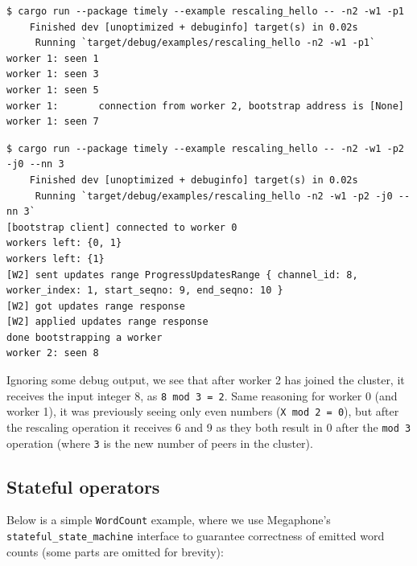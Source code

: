 \documentclass[12pt]{extarticle}
\begin{document}
\begin{verbatim}
$ cargo run --package timely --example rescaling_hello -- -n2 -w1 -p1
    Finished dev [unoptimized + debuginfo] target(s) in 0.02s
     Running `target/debug/examples/rescaling_hello -n2 -w1 -p1`
worker 1: seen 1
worker 1: seen 3
worker 1: seen 5
worker 1:       connection from worker 2, bootstrap address is [None]
worker 1: seen 7
\end{verbatim}

\begin{verbatim}
$ cargo run --package timely --example rescaling_hello -- -n2 -w1 -p2 -j0 --nn 3
    Finished dev [unoptimized + debuginfo] target(s) in 0.02s
     Running `target/debug/examples/rescaling_hello -n2 -w1 -p2 -j0 --nn 3`
[bootstrap client] connected to worker 0
workers left: {0, 1}
workers left: {1}
[W2] sent updates range ProgressUpdatesRange { channel_id: 8, worker_index: 1, start_seqno: 9, end_seqno: 10 }
[W2] got updates range response
[W2] applied updates range response
done bootstrapping a worker
worker 2: seen 8
\end{verbatim}

Ignoring some debug output, we see that after worker 2 has joined the cluster, it receives the input integer 8,
as \verb|8 mod 3 = 2|. Same reasoning for worker 0 (and worker 1), it was previously seeing only even numbers
(\verb|X mod 2 = 0|), but after the rescaling operation it receives 6 and 9 as they both result in 0 after the \verb|mod 3|
operation (where \verb|3| is the new number of peers in the cluster).

\subsection{Stateful operators}

Below is a simple \verb|WordCount| example, where we use Megaphone's \verb|stateful_state_machine|
interface to guarantee correctness of emitted word counts (some parts are omitted for brevity):
\end{document}
